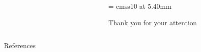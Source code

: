 \documentclass[english,xcolor=table]{beamer}
\begin{document}
\begin{frame}

  \begin{columns}
    \begin{column}{0.70\textwidth}
      \begin{center}
      \begin{figure}[ht]
    \centering
        \def\svgwidth{\columnwidth}
    
\end{figure}

      \end{center}
    \end{column}
    \begin{column}{0.30\textwidth}
      \begin{center}

        \font\endfont = cmss10 at 5.40mm
\color[rgb]{0.00,0.00,1.00}       \endfont 
        \baselineskip 7.0mm

        Thank you for your attention

      \end{center}    

    \end{column}
  \end{columns}

\end{frame}
\begin{frame}{References}
\tiny


    

\end{frame}
\end{document}
